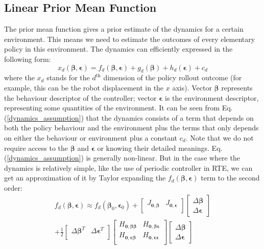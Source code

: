 \documentclass[journal]{IEEEtran}
\begin{document}
\subsection{Linear Prior Mean Function}
The prior mean function gives a prior estimate of the dynamics for a certain environment.
This means we need to estimate the outcomes of every elementary policy in this environment.
The dynamics can efficiently expressed in the following form:
\begin{equation}
x_d(\bm{\beta}, \bm{\epsilon}) = f_d(\bm{\beta}, \bm{\epsilon}) 
+ g_d(\bm{\beta}) 
+ h_d(\bm{\epsilon}) + c_d 
\label{dynamics_assumption}
\end{equation}
where the $x_d$ stands for the $d^{\text{th}}$ dimension of the policy rollout outcome (for example, this can be the robot displacement in the $x$ axis). Vector $\bm{\beta}$ represents the behaviour descriptor of the controller; vector $\bm{\epsilon}$ is the environment descriptor, representing some quantities of the environment. 
It can be seen from Eq. (\ref{dynamics_assumption}) that the dynamics consists of a term that depends on both the policy behaviour and the environment plus the terms that only depends on either the behaviour or environment plus a constant $c_d$.
Note that we do not require access to the $\bm{\beta}$ and $\bm{\epsilon}$ or knowing their detailed meanings.
Eq. (\ref{dynamics_assumption}) is generally non-linear. But in the case where the dynamics is relatively simple, like the use of periodic controller in RTE, we can get an approximation of it by Taylor expanding the $f_d(\bm{\beta}, \bm{\epsilon})$ term to the second order:
\begin{equation}
\begin{gathered}
f_d(\bm{\beta}, \bm{\epsilon}) \approx
f_d(\bm{\beta}_0, \bm{\epsilon}_0) + 
\begin{bmatrix}
J_{\bm{0, \beta}} & J_{\bm{0, \epsilon}} \\
\end{bmatrix}
%
\begin{bmatrix}
\Delta \bm{\beta} \\
\Delta \bm{\epsilon}
\end{bmatrix}
%
\\
%
+ \frac{1}{2}
\begin{bmatrix}
\Delta \bm{\beta}^T & \Delta \bm{\epsilon}^T \\
\end{bmatrix}
%
\begin{bmatrix}
H_{\bm{0, \beta \beta}} & H_{\bm{0}, \bm{\beta \epsilon}} \\
H_{\bm{0, \epsilon \beta}} & H_{\bm{0, \epsilon \epsilon}} \\
\end{bmatrix}
%
\begin{bmatrix}
\Delta \bm{\beta} \\
\Delta \bm{\epsilon}
\end{bmatrix}
\end{gathered}
\label{Taylor_expansion}
\end{equation}
\end{document}
